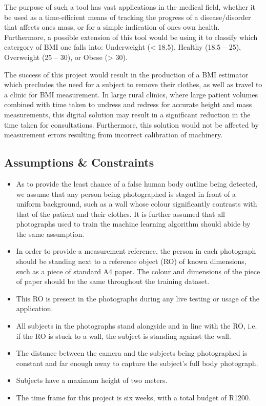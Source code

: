 \documentclass[conference]{IEEEtran}
\begin{document}
The purpose of such a tool has vast applications in the medical field, whether it be used as a time-efficient means of tracking the progress of a disease/disorder that affects ones mass, or for a simple indication of ones own health.
Furthermore, a possible extension of this tool would be using it to classify which catergory of BMI one falls into: Underweight (< 18.5), Healthy (18.5 -- 25), Overweight (25 -- 30), or Obese (> 30).

The success of this project would result in the production of a BMI estimator which precludes the need for a subject to remove their clothes, as well as travel to a clinic for BMI measurement.
In large rural clinics, where large patient volumes combined with time taken to undress and redress for accurate height and mass measurements, this digital solution may result in a significant reduction in the time taken for consultations.
Furthermore, this solution would not be affected by measurement errors resulting from incorrect calibration of machinery.

\subsection{Assumptions \& Constraints}
\begin{itemize}
	\item As to provide the least chance of a false human body outline being detected, we assume that any person being photographed is staged in front of a uniform background, such as a wall whose colour significantly contrasts with that of the patient and their clothes.
	It is further assumed that all photographs used to train the machine learning algorithm should abide by the same assumption.
	\item In order to provide a measurement reference, the person in each photograph should be standing next to a reference object (RO) of known dimensions, such as a piece of standard A4 paper. The colour and dimensions of the piece of paper should be the same throughout the training dataset.
	\item This RO is present in the photographs during any live testing or usage of the application.
	\item All subjects in the photographs stand alongside and in line with the RO, i.e. if the RO is stuck to a wall, the subject is standing against the wall.
	\item The distance between the camera and the subjects being photographed is constant and far enough away to capture the subject's full body photograph.
	\item Subjects have a maximum height of two meters.
	\item The time frame for this project is six weeks, with a total budget of R1200.
\end{itemize}
\end{document}
